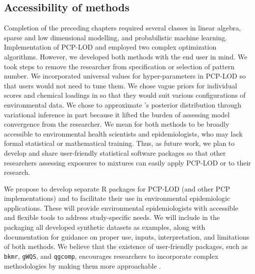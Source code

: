 \subsection{Accessibility of methods}
Completion of the preceding chapters required several classes in linear algebra, sparse and low dimensional modelling, and probabilistic machine learning. Implementation of PCP-LOD and \bnmf employed two complex optimization algorithms. However, we developed both methods with the end user in mind. We took steps to remove the researcher from specification or selection of pattern number. We incorporated universal values for hyper-parameters in PCP-LOD so that users would not need to tune them. We chose vague priors for individual scores and chemical loadings in \bnmf so that they would suit various configurations of environmental data. We chose to approximate \bnmfc's posterior distribution through variational inference in part because it lifted the burden of assessing model convergence from the researcher. We mean for both methods to be broadly accessible to environmental health scientists and epidemiologists, who may lack formal statistical or mathematical training. Thus, as future work, we plan to develop and share user-friendly statistical software packages so that other researchers assessing exposures to mixtures can easily apply PCP-LOD or \bnmf to their research.

We propose to develop separate R packages for PCP-LOD (and other PCP implementations) and \bnmf to facilitate their use in environmental epidemiologic applications. These will provide environmental epidemiologists with accessible and flexible tools to address study-specific needs. We will include in the packaging all developed synthetic datasets as examples, along with documentation for guidance on proper use, inputs, interpretation, and limitations of both methods. We believe that the existence of user-friendly packages, such as \texttt{bkmr}, \texttt{gWQS}, and \texttt{qgcomp}, encourages researchers to incorporate complex methodologies by making them more approachable \citep{bobb2018statistical, renzetti2016gwqs, keil2020quantile}.

